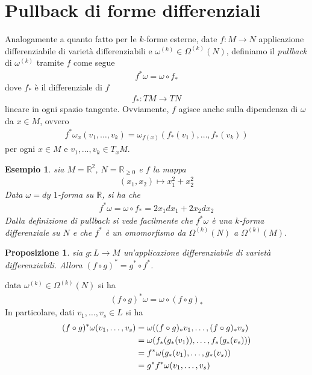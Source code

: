 \documentclass[oneside, 11pt]{amsbook}
\makeatletter
\newcommand{\0}{{(0)}}
\newcommand{\3}{{(3)}}
\theoremstyle{colonplain}
\newtheorem{prop}[thm]{Proposizione}
\theoremstyle{colondefinition}
\newtheorem{ex}[thm]{Esempio}
\theoremstyle{colonremark}
\numberwithin{equation}{chapter}
\renewcommand{\proofname}{Dimostrazione}
\renewenvironment{proof}[1][\proofname]{\par
  \pushQED{\qed}%
  \normalfont \topsep6\p@\@plus6\p@\relax
  \trivlist
  \item[\hskip\labelsep\bfseries #1:]\ignorespaces
}{%
  \popQED\endtrivlist\@endpefalse
}
\makeatother
\begin{document}
\section{Pullback di forme differenziali}
Analogamente a quanto fatto per le $k$-forme esterne, date $f : M \longrightarrow N$ applicazione differenziabile di varietà differenziabili e $\omega^{(k)} \in \Omega^{(k)}(N)$, definiamo il \textit{pullback} di $\omega^{(k)}$ tramite $f$ come segue
\begin{align}
    f^*\omega = \omega \circ f_* 
\end{align}
dove $f_*$ è il differenziale di $f$
\begin{align}
    f_* : TM \longrightarrow TN 
\end{align}
lineare in ogni spazio tangente. Ovviamente, $f$ agisce anche sulla dipendenza di $\omega$ da $x \in M$, ovvero
\begin{align}
    f^*\omega_x(v_1, \dots, v_k) = \omega_{f(x)}(f_*(v_1), \dots, f_*(v_k)) 
\end{align}
per ogni $x \in M$ e $v_1, \dots, v_k \in T_xM$.
\begin{ex} sia $M = \mathbb{R}^2$, $N = \mathbb{R}_{\geq 0}$ e $f$ la mappa
\begin{align}
    (x_1, x_2) \mapsto x^2_1 + x^2_2 
\end{align}
Data $\omega = dy$ $1$-forma su $\mathbb{R}$, si ha che 
\begin{align}
    f^*\omega = \omega \circ f_* = 2x_1dx_1 + 2x_2dx_2 
\end{align}
Dalla definizione di pullback si vede facilmente che $f^*\omega$ è una $k$-forma differenziale su $N$ e che $f^*$ è un omomorfismo da $\Omega^{(k)}(N)$ a $\Omega^{(k)}(M)$.
\end{ex}
\begin{prop} sia $g : L \longrightarrow M$ un'applicazione differenziabile di varietà differenziabili. Allora $(f \circ g)^* = g^* \circ f^*$.
\end{prop}

\begin{proof} data $\omega^{(k)} \in \Omega^{(k)}(N)$ si ha
\begin{align}
    (f \circ g)^*\omega = \omega \circ (f \circ g)_* 
\end{align}
In particolare, dati $v_1, \dots, v_s \in L$ si ha
\begin{align}
    (f \circ g)^*\omega(v_1, \dots, v_s) &= \omega((f \circ g)_*v_1, \dots, (f \circ g)_*v_s) \notag \\
    &= \omega(f_*(g_*(v_1)), \dots, f_*(g_*(v_s))) \notag \\
    &= f^*\omega(g_*(v_1), \dots, g_*(v_s)) \notag \\
    &= g^*f^*\omega(v_1, \dots, v_s) 
\end{align} \end{proof}
\end{document}
